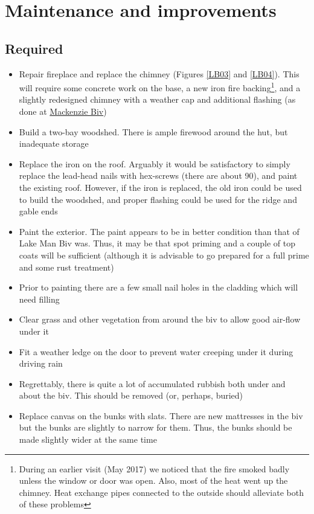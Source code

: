 \documentclass[12pt]{article} %
\begin{document}
\section{Maintenance and improvements}

\subsection{Required}

\begin{itemize}
 \item Repair fireplace and replace the chimney (Figures \ref{LB03} and \ref{LB04}).  This will require some concrete work on the base, a new iron fire backing\footnote{During an earlier visit (May 2017) we noticed that the fire smoked badly unless the window or door was open.  Also, most of the heat went up the chimney.   Heat exchange pipes connected to the outside should alleviate both of these problems}, and a slightly redesigned chimney with a weather cap and additional flashing (as done at \href{https://www.backcountrytrust.org.nz/projects-blog/how-to-renovate-a-nzfs-2-bunk-biv}{Mackenzie Biv})
 \item Build a two-bay woodshed.  There is ample firewood around the hut, but inadequate storage
 \item Replace the iron on the roof.  Arguably it would be satisfactory to simply replace the lead-head nails with hex-screws (there are about 90), and paint the existing roof.  However, if the iron is replaced, the old iron could be used to build the woodshed, and proper flashing could be used for the ridge and gable ends
 \item Paint the exterior.  The paint appears to be in better condition than that of Lake Man Biv was.  Thus, it may be that spot priming and a couple of top coats will be sufficient (although it is advisable to go prepared for a full prime and some rust treatment)
 \item Prior to painting there are a few small nail holes in the cladding which will need filling
 \item Clear grass and other vegetation from around the biv to allow good air-flow under it
 \item Fit a weather ledge on the door to prevent water creeping under it during driving rain
 \item Regrettably, there is quite a lot of accumulated rubbish both under and about the biv.  This should be removed (or, perhaps, buried)
 \item Replace canvas on the bunks with slats.  There are new mattresses in the biv but the bunks are slightly to narrow for them.  Thus, the bunks should be made slightly wider at the same time

\end{itemize}
\end{document}
